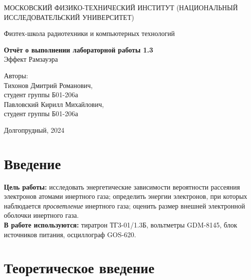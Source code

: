 \documentclass[a4paper, 12pt]{article}
\begin{document}
    \begin{titlepage}
	\begin{center}
            {\large МОСКОВСКИЙ ФИЗИКО-ТЕХНИЧЕСКИЙ ИНСТИТУТ (НАЦИОНАЛЬНЫЙ ИССЛЕДОВАТЕЛЬСКИЙ УНИВЕРСИТЕТ)}
	\end{center}
 
	\begin{center}
		{\large Физтех-школа радиотехники и компьютерных технологий}
	\end{center}
	
	\vspace{8cm}
	{\LARGE
		\begin{center}
                {\bf Отчёт о выполнении лабораторной работы 1.3}\\
                Эффект Рамзауэра
		\end{center}
	}
	\vspace{3 cm}
	\begin{flushright}
		{\Large Авторы: \\ 
        Тихонов Дмитрий Романович, \\ студент группы Б01-206а \\
        Павловский Кирилл Михайлович, \\ студент группы Б01-206а}
	\end{flushright}
	\vspace{4cm}
	\begin{center}
		\Large Долгопрудный, 2024
	\end{center}
    \end{titlepage}


    \section{Введение}

    \noindent \textbf{Цель работы:} исследовать энергетические зависимости вероятности рассеяния электронов атомами инертного газа; определить энергии электронов, при которых наблюдается \textit{просветление} инертного газа; оценить размер внешней электронной оболочки инертного газа. \\
	
    \noindent \textbf{В работе используются:} тиратрон ТГ3-01/1.3Б, вольтметры GDM-8145, блок источников питания, осциллограф GOS-620.
    
    \section{Теоретическое введение}
\end{document}
